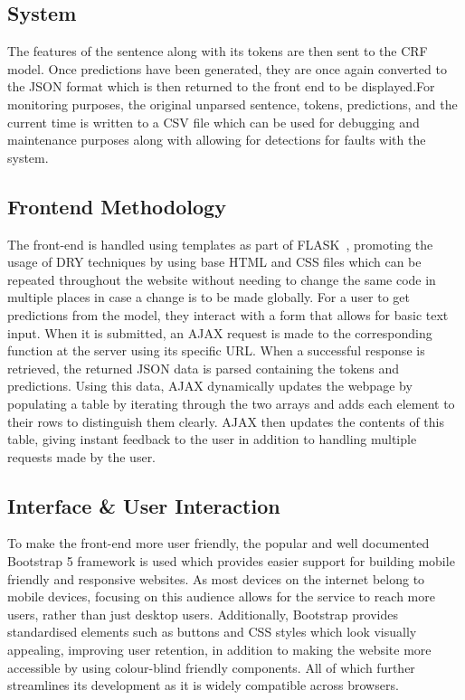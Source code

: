 \documentclass{surreydissertation}
\begin{document}
\subsection{System}
The features of the sentence along with its tokens are then sent to the CRF model. Once predictions have been generated, they are once again converted to the JSON format which is then returned to the front end to be displayed.For monitoring purposes, the original unparsed sentence, tokens, predictions, and the current time is written to a CSV file which can be used for debugging and maintenance purposes along with allowing for detections for faults with the system.

\subsection{Frontend Methodology}
The front-end is handled using templates as part of FLASK~\cite{flask}, promoting the usage of DRY techniques by using base HTML and CSS files which can be repeated throughout the website without needing to change the same code in multiple places in case a change is to be made globally. For a user to get predictions from the model, they interact with a form that allows for basic text input. When it is submitted, an AJAX request is made to the corresponding function at the server using its specific URL. When a successful response is retrieved, the returned JSON data is parsed containing the tokens and predictions. Using this data, AJAX dynamically updates the webpage by populating a table by iterating through the two arrays and adds each element to their rows to distinguish them clearly. AJAX then updates the contents of this table, giving instant feedback to the user in addition to handling multiple requests made by the user.

\subsection{Interface \& User Interaction}
To make the front-end more user friendly, the popular and well documented Bootstrap 5 framework is used which provides easier support for building mobile friendly and responsive websites. As most devices on the internet belong to mobile devices, focusing on this audience allows for the service to reach more users, rather than just desktop users. Additionally, Bootstrap provides standardised elements such as buttons and CSS styles which look visually appealing, improving user retention, in addition to making the website more accessible by using colour-blind friendly components. All of which further streamlines its development as it is widely compatible across browsers.
\end{document}
